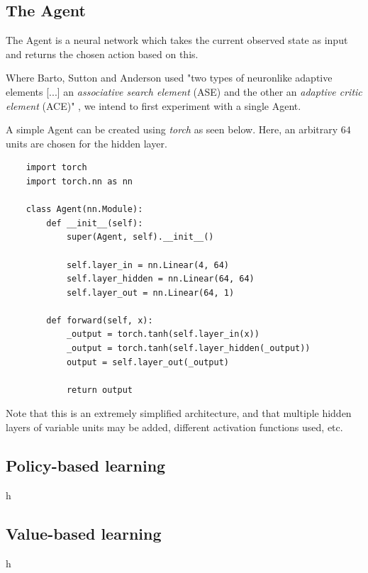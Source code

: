 \documentclass{article}
\renewenvironment{leftbar}[1][\hsize]{
    \def\FrameCommand{{\color{barcolor}\vrule width 2pt \hspace{10pt}}}
    \MakeFramed{\hsize#1 \advance\hsize-\width \FrameRestore}
}{\endMakeFramed}
\begin{document}
\subsection*{The Agent}
\begin{leftbar}
    The Agent is a neural network which takes the current observed state as input and returns the chosen action based on this.

    Where Barto, Sutton and Anderson used "two types of neuronlike adaptive elements [...] an \textit{associative search element} (ASE) and the other an \textit{adaptive critic element} (ACE)" \cite{Neuronlike}, we intend to first experiment with a single Agent.

    A simple Agent can be created using \textit{torch} as seen below. Here, an arbitrary $64$ units are chosen for the hidden layer.

    \begin{lstlisting}
    import torch
    import torch.nn as nn
    
    class Agent(nn.Module):
        def __init__(self):
            super(Agent, self).__init__()
            
            self.layer_in = nn.Linear(4, 64)
            self.layer_hidden = nn.Linear(64, 64)
            self.layer_out = nn.Linear(64, 1)
            
        def forward(self, x):
            _output = torch.tanh(self.layer_in(x))
            _output = torch.tanh(self.layer_hidden(_output))
            output = self.layer_out(_output)
            
            return output
    \end{lstlisting}

    Note that this is an extremely simplified architecture, and that multiple hidden layers of variable units may be added, different activation functions used, etc.

\end{leftbar}
\subsection*{Policy-based learning}
\begin{leftbar}
    h
\end{leftbar}
\subsection*{Value-based learning}
\begin{leftbar}
    h
\end{leftbar}
\end{document}
